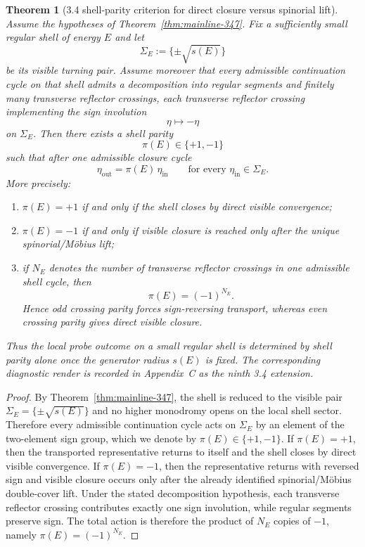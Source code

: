 \documentclass[12pt,a4paper]{article}
\newtheorem{theorem}{Theorem}[section]
\begin{document}
\begin{theorem}[3.4 shell-parity criterion for direct closure versus spinorial lift]
\label{thm:mainline-348}
Assume the hypotheses of Theorem~\ref{thm:mainline-347}. Fix a sufficiently small regular shell of energy $E$ and let
\[
 \Sigma_E:=\{\pm\sqrt{s(E)}\}
\]
be its visible turning pair. Assume moreover that every admissible continuation cycle on that shell admits a decomposition into regular segments and finitely many transverse reflector crossings, each transverse reflector crossing implementing the sign involution
\[
 \eta\longmapsto -\eta
\]
on $\Sigma_E$. Then there exists a shell parity
\[
 \pi(E)\in\{+1,-1\}
\]
such that after one admissible closure cycle
\[
 \eta_{\mathrm{out}}=\pi(E)\,\eta_{\mathrm{in}}
\qquad
\text{for every }
\eta_{\mathrm{in}}\in\Sigma_E.
\]
More precisely:
\begin{enumerate}[label=(\roman*)]
 \item $\pi(E)=+1$ if and only if the shell closes by direct visible convergence;
 \item $\pi(E)=-1$ if and only if visible closure is reached only after the unique spinorial/M\"obius lift;
 \item if $N_E$ denotes the number of transverse reflector crossings in one admissible shell cycle, then
 \[
 \pi(E)=(-1)^{N_E}.
 \]
 Hence odd crossing parity forces sign-reversing transport, whereas even crossing parity gives direct visible closure.
\end{enumerate}
Thus the local probe outcome on a small regular shell is determined by shell parity alone once the generator radius $s(E)$ is fixed.
The corresponding diagnostic render is recorded in Appendix~C as the ninth 3.4 extension.
\end{theorem}

\begin{proof}
By Theorem~\ref{thm:mainline-347}, the shell is reduced to the visible pair $\Sigma_E=\{\pm\sqrt{s(E)}\}$ and no higher monodromy opens on the local shell sector. Therefore every admissible continuation cycle acts on $\Sigma_E$ by an element of the two-element sign group, which we denote by $\pi(E)\in\{+1,-1\}$. If $\pi(E)=+1$, then the transported representative returns to itself and the shell closes by direct visible convergence. If $\pi(E)=-1$, then the representative returns with reversed sign and visible closure occurs only after the already identified spinorial/M\"obius double-cover lift. Under the stated decomposition hypothesis, each transverse reflector crossing contributes exactly one sign involution, while regular segments preserve sign. The total action is therefore the product of $N_E$ copies of $-1$, namely $\pi(E)=(-1)^{N_E}$.
\end{proof}
\end{document}
